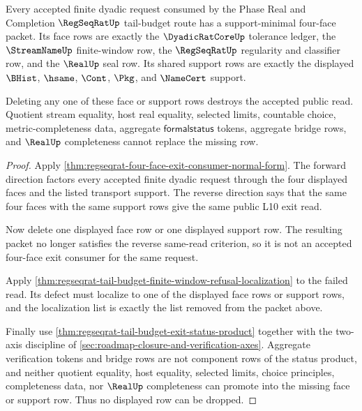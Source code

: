 \begin{theorem}
\label{thm:regseqrat-tail-budget-support-minimality}
Every accepted finite dyadic request consumed by the Phase Real and Completion $\RegSeqRatUp$ tail-budget route has a support-minimal four-face packet. Its face rows are exactly the $\DyadicRatCoreUp$ tolerance ledger, the $\StreamNameUp$ finite-window row, the $\RegSeqRatUp$ regularity and classifier row, and the $\RealUp$ seal row. Its shared support rows are exactly the displayed $\BHist$, $\hsame$, $\Cont$, $\Pkg$, and $\NameCert$ support.

Deleting any one of these face or support rows destroys the accepted public read. Quotient stream equality, host real equality, selected limits, countable choice, metric-completeness data, aggregate $\mathsf{formalstatus}$ tokens, aggregate bridge rows, and $\RealUp$ completeness cannot replace the missing row.
\end{theorem}
\begin{proof}
Apply \autoref{thm:regseqrat-four-face-exit-consumer-normal-form}. The forward direction factors every accepted finite dyadic request through the four displayed faces and the listed transport support. The reverse direction says that the same four faces with the same support rows give the same public L10 exit read.

Now delete one displayed face row or one displayed support row. The resulting packet no longer satisfies the reverse same-read criterion, so it is not an accepted four-face exit consumer for the same request.

Apply \autoref{thm:regseqrat-tail-budget-finite-window-refusal-localization} to the failed read. Its defect must localize to one of the displayed face rows or support rows, and the localization list is exactly the list removed from the packet above.

Finally use \autoref{thm:regseqrat-tail-budget-exit-status-product} together with the two-axis discipline of \autoref{sec:roadmap-closure-and-verification-axes}. Aggregate verification tokens and bridge rows are not component rows of the status product, and neither quotient equality, host equality, selected limits, choice principles, completeness data, nor $\RealUp$ completeness can promote into the missing face or support row. Thus no displayed row can be dropped.
\end{proof}

